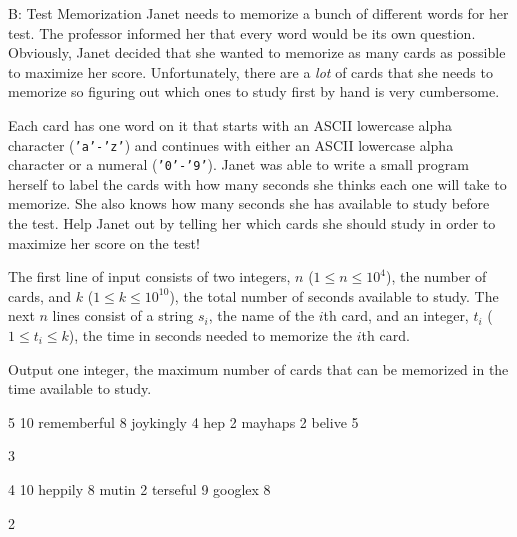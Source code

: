 \begin{problem}{B: Test Memorization}
Janet needs to memorize a bunch of different words for her test.
The professor informed her that every word would be its own question.
Obviously, Janet decided that she wanted to memorize as many cards as possible to maximize her score.
Unfortunately, there are a \textit{lot} of cards that she needs to memorize so figuring out which ones to study first by hand is very cumbersome.

Each card has one word on it that starts with an ASCII lowercase alpha character (\texttt{'a'-'z'}) and continues with either an ASCII lowercase alpha character or a numeral (\texttt{'0'-'9'}).
Janet was able to write a small program herself to label the cards with how many seconds she thinks each one will take to memorize.
She also knows how many seconds she has available to study before the test.
Help Janet out by telling her which cards she should study in order to maximize her score on the test!
\end{problem}

\begin{formalin}
The first line of input consists of two integers, $n$ ($1 \leq n \leq 10^4$), the number of cards, and $k$ ($1 \leq k \leq 10^{10}$), the total number of seconds available to study. 
The next $n$ lines consist of a string $s_i$, the name of the $i$th card, and an integer, $t_i$ ($1 \leq t_i \leq k$), the time in seconds needed to memorize the $i$th card.
\end{formalin}

\begin{formalout}
Output one integer, the maximum number of cards that can be memorized in the time available to study.
\end{formalout}

\begin{datain}
5 10
rememberful 8
joykingly 4
hep 2
mayhaps 2
belive 5
\end{datain}
\begin{dataout}
3
\end{dataout}

\begin{datain}
4 10
heppily 8
mutin 2
terseful 9
googlex 8
\end{datain}
\begin{dataout}
2
\end{dataout}
